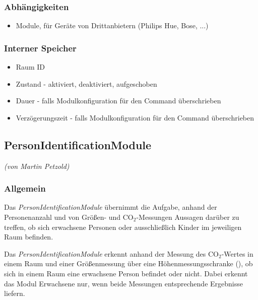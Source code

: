 \subsubsection{Abhängigkeiten}
\begin{itemize}
	\item Module, für Geräte von Drittanbietern (Philips Hue, Bose, ...)
\end{itemize}

\subsubsection{Interner Speicher}
\begin{itemize}
	\item Raum ID
	\item Zustand - aktiviert, deaktiviert, aufgeschoben
	\item Dauer - falls Modulkonfiguration für den Command überschrieben
	\item Verzögerungszeit - falls Modulkonfiguration für den Command überschrieben
	
\end{itemize}


\newpage
\subsection{PersonIdentificationModule}
\emph{(von Martin Petzold)}

\subsubsection{Allgemein}
Das \emph{PersonIdentificationModule} übernimmt die Aufgabe, anhand der Personenanzahl und von Größen- und CO$_2$-Messungen Aussagen darüber zu treffen, ob sich erwachsene Personen oder ausschließlich Kinder im  jeweiligen Raum befinden.

Das \emph{PersonIdentificationModule} erkennt anhand der Messung des CO$_2$-Wertes in einem Raum und einer Größenmessung über eine Höhenmessungsschranke (), ob sich in einem Raum eine erwachsene Person befindet oder nicht. Dabei erkennt das Modul Erwachsene nur, wenn beide Messungen entsprechende Ergebnisse liefern.

